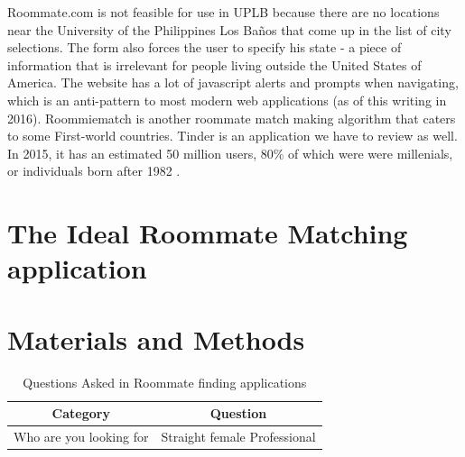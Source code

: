 \documentclass[journal]{./IEEE/IEEEtran}
\newcommand{\UPLB}{University of the Philippines Los Ba\~{n}os }
\begin{document}
Roommate.com is not feasible for use in UPLB because there are no locations near the \UPLB that come up in the list of city selections. The form also forces the user to specify his state - a piece of information that is irrelevant for people living outside the United States of America. The website has a lot of javascript alerts and prompts when navigating, which is an anti-pattern to most modern web applications (as of this writing in 2016).
Roommiematch is another roommate match making algorithm that caters to some First-world countries.
Tinder is an application we have to review as well. In 2015, it has an estimated 50 million users\cite{tinderstat2}, 80\% of which were were millenials, or individuals born after 1982 \cite{tinderstat}\cite{millenial}.

\section{The Ideal Roommate Matching application}

\section{Materials and Methods}



\appendices

\begin{table}
\caption{Questions Asked in Roommate finding applications}
\label{Roommates.com and Roommiemates.com}
\centering
\begin{tabular}{c | c}
\hline
\bfseries Category & \bfseries Question  \\
\hline\hline
Who are you looking for & Straight female Professional
\end{tabular}
\end{table}
\end{document}
